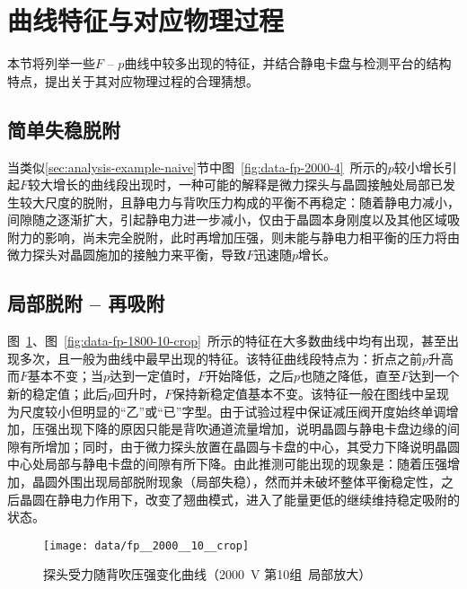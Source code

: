 \clearpage



\section{曲线特征与对应物理过程}\label{sec:analysis-feature}

本节将列举一些$F$ -- $p$曲线中较多出现的特征，并结合静电卡盘与检测平台的结构特点，提出关于其对应物理过程的合理猜想。


\subsection{简单失稳脱附}\label{sec:analysis-feature-destabilize}

当类似\ref{sec:analysis-example-naive}节中图~\ref{fig:data-fp-2000-4}~所示的$p$较小增长引起$F$较大增长的曲线段出现时，一种可能的解释是微力探头与晶圆接触处局部已发生较大尺度的脱附，且静电力与背吹压力构成的平衡不再稳定：随着静电力减小，间隙随之逐渐扩大，引起静电力进一步减小，仅由于晶圆本身刚度以及其他区域吸附力的影响，尚未完全脱附，此时再增加压强，则未能与静电力相平衡的压力将由微力探头对晶圆施加的接触力来平衡，导致$F$迅速随$p$增长。


\subsection{局部脱附 -- 再吸附}\label{sec:analysis-feature-reattach}

图~\ref{fig:data-fp-2000-10-crop}、图~\ref{fig:data-fp-1800-10-crop}~所示的特征在大多数曲线中均有出现，甚至出现多次，且一般为曲线中最早出现的特征。该特征曲线段特点为：折点之前$p$升高而$F$基本不变；当$p$达到一定值时，$F$开始降低，之后$p$也随之降低，直至$F$达到一个新的稳定值；此后$p$回升时，$F$保持新稳定值基本不变。该特征一般在图线中呈现为尺度较小但明显的“乙”或“已”字型。由于试验过程中保证减压阀开度始终单调增加，压强出现下降的原因只能是背吹通道流量增加，说明晶圆与静电卡盘边缘的间隙有所增加；同时，由于微力探头放置在晶圆与卡盘的中心，其受力下降说明晶圆中心处局部与静电卡盘的间隙有所下降。由此推测可能出现的现象是：随着压强增加，晶圆外围出现局部脱附现象（局部失稳），然而并未破坏整体平衡稳定性，之后晶圆在静电力作用下，改变了翘曲模式，进入了能量更低的继续维持稳定吸附的状态。

\begin{figure}[thbp]
\centering
\texttt{[image: data/fp\_\_2000\_\_10\_\_crop]}
\caption{探头受力随背吹压强变化曲线（\SI{2000}{\V} 第10组\ 局部放大）}
\label{fig:data-fp-2000-10-crop}
\end{figure}


